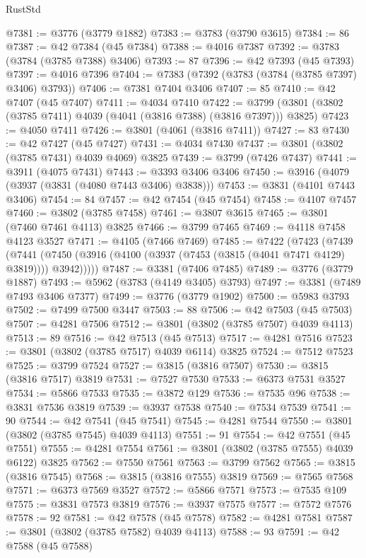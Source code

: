 \begin{lexlean}{RustStd}
\begin{coremodule}
@7381 := @3776 (@3779 @1882)
@7383 := @3783 (@3790 @3615)
@7384 := 86
@7387 := @42 @7384 (@45 @7384)
@7388 := @4016 @7387
@7392 := @3783 (@3784 (@3785 @7388) @3406)
@7393 := 87
@7396 := @42 @7393 (@45 @7393)
@7397 := @4016 @7396
@7404 := @7383 (@7392 (@3783 (@3784 (@3785 @7397) @3406) @3793))
@7406 := @7381 @7404 @3406
@7407 := 85
@7410 := @42 @7407 (@45 @7407)
@7411 := @4034 @7410
@7422 := @3799 (@3801 (@3802 (@3785 @7411) @4039 (@4041 (@3816 @7388) (@3816 @7397))) @3825)
@7423 := @4050 @7411
@7426 := @3801 (@4061 (@3816 @7411))
@7427 := 83
@7430 := @42 @7427 (@45 @7427)
@7431 := @4034 @7430
@7437 := @3801 (@3802 (@3785 @7431) @4039 @4069) @3825
@7439 := @3799 (@7426 @7437)
@7441 := @3911 (@4075 @7431)
@7443 := @3393 @3406 @3406
@7450 := @3916 (@4079 (@3937 (@3831 (@4080 @7443 @3406) @3838)))
@7453 := @3831 (@4101 @7443 @3406)
@7454 := 84
@7457 := @42 @7454 (@45 @7454)
@7458 := @4107 @7457
@7460 := @3802 (@3785 @7458)
@7461 := @3807 @3615
@7465 := @3801 (@7460 @7461 @4113) @3825
@7466 := @3799 @7465
@7469 := @4118 @7458 @4123 @3527
@7471 := @4105 (@7466 @7469)
@7485 := @7422
    (@7423
      (@7439
        (@7441 (@7450 (@3916 (@4100 (@3937 (@7453 (@3815 (@4041 @7471 @4129) @3819)))) @3942)))))
@7487 := @3381 (@7406 @7485)
@7489 := @3776 (@3779 @1887)
@7493 := @5962 (@3783 (@4149 @3405) @3793)
@7497 := @3381 (@7489 @7493 @3406 @7377)
@7499 := @3776 (@3779 @1902)
@7500 := @5983 @3793
@7502 := @7499 @7500 @3447
@7503 := 88
@7506 := @42 @7503 (@45 @7503)
@7507 := @4281 @7506
@7512 := @3801 (@3802 (@3785 @7507) @4039 @4113)
@7513 := 89
@7516 := @42 @7513 (@45 @7513)
@7517 := @4281 @7516
@7523 := @3801 (@3802 (@3785 @7517) @4039 @6114) @3825
@7524 := @7512 @7523
@7525 := @3799 @7524
@7527 := @3815 (@3816 @7507)
@7530 := @3815 (@3816 @7517) @3819
@7531 := @7527 @7530
@7533 := @6373 @7531 @3527
@7534 := @5866 @7533
@7535 := @3872 @129
@7536 := @7535 @96
@7538 := @3831 @7536 @3819
@7539 := @3937 @7538
@7540 := @7534 @7539
@7541 := 90
@7544 := @42 @7541 (@45 @7541)
@7545 := @4281 @7544
@7550 := @3801 (@3802 (@3785 @7545) @4039 @4113)
@7551 := 91
@7554 := @42 @7551 (@45 @7551)
@7555 := @4281 @7554
@7561 := @3801 (@3802 (@3785 @7555) @4039 @6122) @3825
@7562 := @7550 @7561
@7563 := @3799 @7562
@7565 := @3815 (@3816 @7545)
@7568 := @3815 (@3816 @7555) @3819
@7569 := @7565 @7568
@7571 := @6373 @7569 @3527
@7572 := @5866 @7571
@7573 := @7535 @109
@7575 := @3831 @7573 @3819
@7576 := @3937 @7575
@7577 := @7572 @7576
@7578 := 92
@7581 := @42 @7578 (@45 @7578)
@7582 := @4281 @7581
@7587 := @3801 (@3802 (@3785 @7582) @4039 @4113)
@7588 := 93
@7591 := @42 @7588 (@45 @7588)

\end{coremodule}
\end{lexlean}
